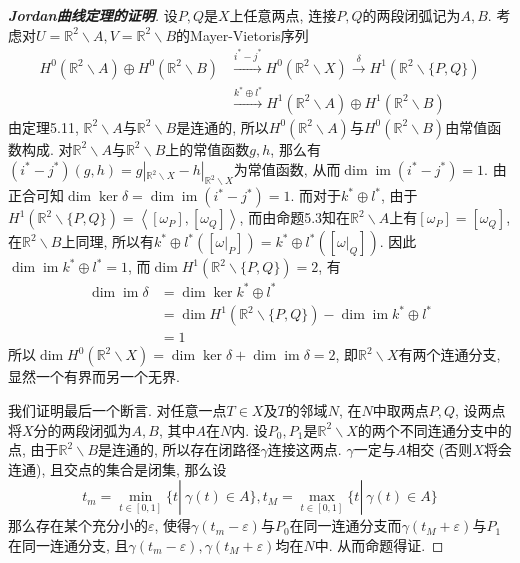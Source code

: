 \documentclass[11pt]{article}
\theoremstyle{definition}\newtheorem*{analyse}{分析}
\theoremstyle{remark}\newtheorem{rem*}{评注}
\DeclareMathOperator{\im}{im}
\begin{document}
\begin{proof}[{\bf Jordan曲线定理的证明}]
    设$P,Q$是$X$上任意两点, 连接$P,Q$的两段闭弧记为$A,B$.
    考虑对$U=\mathbb{R}^2\backslash A,V=\mathbb{R}^2\backslash B$的Mayer-Vietoris序列
    \begin{align*}
        H^0(\mathbb{R}^2\backslash A)\oplus H^0(\mathbb{R}^2\backslash B)&\xrightarrow{i^*-j^*}H^0(\mathbb{R}^2\backslash X)\xrightarrow{\delta}H^1(\mathbb{R}^2\backslash\{P,Q\})\\
        &\xrightarrow{k^*\oplus l^*}H^1(\mathbb{R}^2\backslash A)\oplus H^1(\mathbb{R}^2\backslash B)
    \end{align*}
    由定理5.11, $\mathbb{R}^2\backslash A$与$\mathbb{R}^2\backslash B$是连通的, 所以$H^0(\mathbb{R}^2\backslash A)$与$H^0(\mathbb{R}^2\backslash B)$由常值函数构成.
    对$\mathbb{R}^2\backslash A$与$\mathbb{R}^2\backslash B$上的常值函数$g,h$, 那么有$(i^*-j^*)(g,h)=g|_{\mathbb{R}^2\backslash X}-h|_{\mathbb{R}^2\backslash X}$为常值函数, 从而$\dim\im(i^*-j^*)=1$.
    由正合可知$\dim\ker\delta=\dim\im(i^*-j^*)=1$.
    而对于$k^*\oplus l^*$, 由于$H^1(\mathbb{R}^2\backslash\{P,Q\})=\left\langle[\omega_P],[\omega_Q]\right\rangle$, 而由命题5.3知在$\mathbb{R}^2\backslash A$上有$[\omega_P]=[\omega_Q]$, 在$\mathbb{R}^2\backslash B$上同理, 所以有$k^*\oplus l^*([\omega|_P])=k^*\oplus l^*([\omega|_Q])$.
    因此$\dim\im k^*\oplus l^*=1$, 而$\dim H^1(\mathbb{R}^2\backslash\{P,Q\})=2$, 有
    \begin{align*}
        \dim\im\delta&=\dim\ker k^*\oplus l^*\\
        &=\dim H^1(\mathbb{R}^2\backslash\{P,Q\})-\dim\im k^*\oplus l^*\\
        &=1
    \end{align*}
    所以$\dim H^0(\mathbb{R}^2\backslash X)=\dim\ker\delta+\dim\im\delta=2$, 即$\mathbb{R}^2\backslash X$有两个连通分支, 显然一个有界而另一个无界.

    我们证明最后一个断言.
    对任意一点$T\in X$及$T$的邻域$N$, 在$N$中取两点$P,Q$, 设两点将$X$分的两段闭弧为$A,B$, 其中$A$在$N$内.
    设$P_0,P_1$是$\mathbb{R}^2\backslash X$的两个不同连通分支中的点, 由于$\mathbb{R}^2\backslash B$是连通的, 所以存在闭路径$\gamma$连接这两点.
    $\gamma$一定与$A$相交 (否则$X$将会连通), 且交点的集合是闭集, 那么设
    \[t_m=\min_{t\in[0,1]}\{t|\ \gamma(t)\in A\},t_M=\max_{t\in[0,1]}\{t|\ \gamma(t)\in A\}\]
    那么存在某个充分小的$\varepsilon$, 使得$\gamma(t_m-\varepsilon)$与$P_0$在同一连通分支而$\gamma(t_M+\varepsilon)$与$P_1$在同一连通分支, 且$\gamma(t_m-\varepsilon),\gamma(t_M+\varepsilon)$均在$N$中.
    从而命题得证.
\end{proof}

\printbibliography[title={参考文献}]
\end{document}
